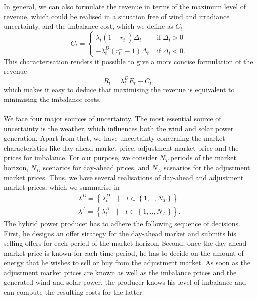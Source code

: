 In general, we can also formulate the revenue in terms of the maximum level of revenue, which could be realised in a situation free of wind and irradiance uncertainty, and the imbalance cost, which we define as $C_{t}$
\begin{equation*}
	C_{t}=\begin{cases}
		\lambda_{t}\left(1-r_{t}^{+}\right)\Delta_{t} &\mathrm{\; if \;} \Delta_{t}>0
		\\ -\lambda_{t}^{D}\left(r_{t}^{-}-1\right)\Delta_{t} &\mathrm{\; if \;} \Delta_{t}<0.
	\end{cases}
\end{equation*}
This characterisation renders it possible to give a more concise formulation of the revenue 
\begin{equation*}
	R_{t}=\lambda_{t}^{D}E_{t}-C_{t},
\end{equation*}
which makes it easy to deduce that maximising the revenue is equivalent to minimising the imbalance costs. 
\\ \\
We face four major sources of uncertainty. The most essential source of uncertainty is the weather, which influences both the wind and solar power generation. Apart from that, we have uncertainty concerning the market characteristics like day-ahead market price, adjustment market price and the prices for imbalance.
For our purpose, we consider $N_{T}$ periods of the market horizon, $N_{D}$ scenarios for day-ahead prices, and $N_{A}$ scenarios for the adjustment market prices. Thus, we have several realisations of day-ahead and adjustment market prices, which we summarise in
\begin{align*}
	\lambda^{D}=\left\{\lambda_{t}^{D} \quad \lvert \quad t \in \left\{1, .., N_{T}\right\}\right\}
	\\ \lambda^{A}=\left\{\lambda_{t}^{A}\quad \lvert \quad t \in \left\{1, .., N_{A}\right\}\right\}.
\end{align*}
The hybrid power producer has to adhere the following sequence of decisions. First, he designs an offer strategy for the day-ahead market and submits his selling offers for each period of the market horizon. Second, once the day-ahead market price is known for each time period, he has to decide on the amount of energy that he wishes to sell or buy from the adjustment market. As soon as the adjustment market prices are known as well as the imbalance prices and the generated wind and solar power, the producer knows his level of imbalance and can compute the resulting costs for the latter.  